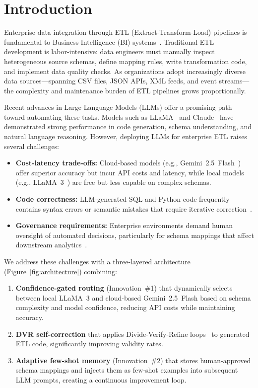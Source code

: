 \documentclass[conference]{IEEEtran}
\begin{document}
\section{Introduction}
\label{sec:introduction}

Enterprise data integration through ETL (Extract-Transform-Load) pipelines
is fundamental to Business Intelligence (BI) systems~\cite{elsappagh2011}.
Traditional ETL development is labor-intensive: data engineers must manually
inspect heterogeneous source schemas, define mapping rules, write
transformation code, and implement data quality checks. As organizations
adopt increasingly diverse data sources---spanning CSV files, JSON APIs,
XML feeds, and event streams---the complexity and maintenance burden of
ETL pipelines grows proportionally.

Recent advances in Large Language Models (LLMs) offer a promising path
toward automating these tasks. Models such as LLaMA~\cite{touvron2023}
and Claude~\cite{anthropic2024} have demonstrated strong performance in
code generation, schema understanding, and natural language reasoning.
However, deploying LLMs for enterprise ETL raises several challenges:

\begin{itemize}
\item \textbf{Cost-latency trade-offs:} Cloud-based models (e.g., Gemini~2.5~Flash~\cite{google2024gemini})
offer superior accuracy but incur API costs and latency, while local
models (e.g., LLaMA~3~\cite{touvron2023}) are free but less capable on complex schemas.
\item \textbf{Code correctness:} LLM-generated SQL and Python code
frequently contains syntax errors or semantic mistakes that require
iterative correction~\cite{zhang2024dvr}.
\item \textbf{Governance requirements:} Enterprise environments demand
human oversight of automated decisions, particularly for schema mappings
that affect downstream analytics~\cite{annam2025}.
\end{itemize}

We address these challenges with a three-layered architecture (Figure~\ref{fig:architecture}) combining:
\begin{enumerate}
\item \textbf{Confidence-gated routing} (Innovation~\#1) that dynamically
selects between local LLaMA~3 and cloud-based Gemini~2.5~Flash based on schema
complexity and model confidence, reducing API costs while maintaining accuracy.
\item \textbf{DVR self-correction} that applies Divide-Verify-Refine
loops~\cite{zhang2024dvr} to generated ETL code, significantly improving
validity rates.
\item \textbf{Adaptive few-shot memory} (Innovation~\#2) that stores
human-approved schema mappings and injects them as few-shot examples
into subsequent LLM prompts, creating a continuous improvement loop.
\end{enumerate}
\end{document}
